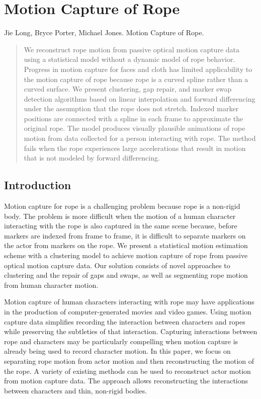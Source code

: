 \chapter{Motion Capture of Rope}
\label{chap:rope}

\noindent
Jie Long, Bryce Porter, Michael Jones. Motion Capture of Rope.

\begin{abstract}
We reconstruct rope motion from passive optical motion capture data using a statistical model without a dynamic model of rope behavior.  Progress in motion capture for faces and cloth has limited applicability to the motion capture of rope because rope is a curved spline rather than a curved surface.  We present clustering, gap repair, and marker swap detection algorithms based on linear interpolation and forward differencing under the assumption that the rope does not stretch.  Indexed marker positions are connected with a spline in each frame to approximate the original rope.  The model produces visually plausible animations of rope motion from data collected for a person interacting with rope.  The method fails when the rope experiences large accelerations that result in motion that is not modeled by forward differencing. 
\end{abstract}

\section{Introduction} 

Motion capture for rope is a challenging problem because rope is a non-rigid body.  The problem is more difficult when the motion of a human character interacting with the rope is also captured in the same scene because, before markers are indexed from frame to frame, it is difficult to separate markers on the actor from markers on the rope.  We present a statistical motion estimation scheme with a clustering model to achieve motion capture of rope from passive optical motion capture data. Our solution consists of novel approaches to clustering and the repair of gaps and swaps, as well as segmenting rope motion from human character motion.

Motion capture of human characters interacting with rope may have applications in the production of computer-generated movies and video games.  Using motion capture data simplifies recording the interaction between characters and ropes while preserving the subtleties of that interaction.  Capturing interactions between rope and characters may be particularly compelling when motion capture is already being used to record character motion.  In this paper, we focus on separating rope motion from actor motion and then reconstructing the motion of the rope.  A variety of existing methods can be used to reconstruct actor motion from motion capture data.  The approach allows reconstructing the interactions between characters and thin, non-rigid bodies.

